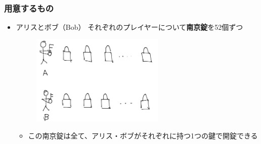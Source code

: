 \begin{frame}
  \frametitle{用意するもの}

  \begin{itemize}
    \item<+-> アリスとボブ（Bob）
    それぞれのプレイヤーについて\textbf{南京錠}を52個ずつ
    \begin{figure}[h]
      \includegraphics[width=0.6\textwidth]{img/padlocks.png}
    \end{figure}
    \begin{itemize}
      \item この南京錠は全て、アリス・ボブがそれぞれに持つ1つの鍵で開錠できる
    \end{itemize}    
  \end{itemize}
\end{frame}

